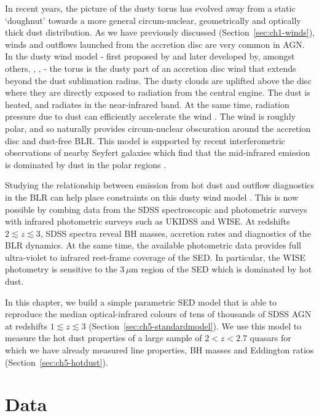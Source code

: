 In recent years, the picture of the dusty torus has evolved away from a static `doughnut' towards a more general circum-nuclear, geometrically and optically thick dust distribution. 
As we have previously discussed (Section~\ref{sec:ch1-winds}), winds and outflows launched from the accretion disc are very common in AGN. 
In the dusty wind model - first proposed by \citet{konigl94} and later developed by, amongst others, \citet{everett05}, \citet{elitzur06}, \citet{keating12} - the torus is the dusty part of an accretion disc wind that extends beyond the dust sublimation radius.  
The dusty clouds are uplifted above the disc where they are directly exposed to radiation from the central engine. 
The dust is heated, and radiates in the near-infrared band.
At the same time, radiation pressure due to dust can efficiently accelerate the wind \citep[e.g.][]{fabian12}. 
The wind is roughly polar, and so naturally provides circum-nuclear obscuration around the accretion disc and dust-free BLR.   
This model is supported by recent interferometric observations of nearby Seyfert galaxies which find that the mid-infrared emission is dominated by dust in the polar regions \citep[e.g.][]{raban09,honig12,honig13,tristram14,lopez-gonzaga16}.

Studying the relationship between emission from hot dust and outflow diagnostics in the BLR can help place constraints on this dusty wind model \citep[e.g.][]{wang13}. 
This is now possible by combing data from the SDSS spectroscopic and photometric surveys with infrared photometric surveys such as UKIDSS and WISE. 
At redshifts $2\lesssim z \lesssim3$, SDSS spectra reveal BH masses, accretion rates and diagnostics of the BLR dynamics. 
At the same time, the available photometric data provides full ultra-violet to infrared rest-frame coverage of the SED.
In particular, the WISE photometry is sensitive to the $3$\,$\mu$m region of the SED which is dominated by hot dust. 

In this chapter, we build a simple parametric SED model that is able to reproduce the median optical-infrared colours of tens of thousands of SDSS AGN at redshifts $1 \lesssim z \lesssim 3$ (Section~\ref{sec:ch5-standardmodel}).
We use this model to measure the hot dust properties of a large sample of $2 < z < 2.7$ quasars for which we have already measured  line properties, BH masses and Eddington ratios (Section~\ref{sec:ch5-hotdust}).

\section{Data}

